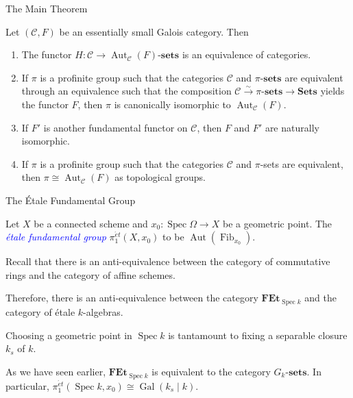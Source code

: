 \documentclass{beamer}
\newcommand{\catSets}{\mathbf{Sets}}
\newcommand{\sets}[1]{#1\text{-}\mathbf{sets}}
\newcommand{\Aut}{\operatorname{Aut}}
\newcommand{\Gal}{\operatorname{Gal}}
\newcommand{\Spec}{\operatorname{Spec}}
\newcommand{\scrC}{\mathscr{C}} %
\newcommand{\define}[1]{\textcolor{blue}{\textit{#1}}}
\begin{document}
\begin{frame}{The Main Theorem}
	\begin{theorem}
		Let $(\scrC, F)$ be an essentially small Galois category. Then 
		\begin{enumerate}
			\item The functor $H:\scrC\to\sets{\Aut_{\scrC}(F)}$ is an equivalence of categories. \pause 
			\item If $\pi$ is a profinite group such that the categories $\scrC$ and $\sets{\pi}$ are equivalent through an equivalence such that the composition $\scrC\xrightarrow{\sim}\sets{\pi}\to\catSets$ yields the functor $F$, then $\pi$ is canonically isomorphic to $\Aut_{\scrC}(F)$. \pause 
			\item If $F'$ is another fundamental functor on $\scrC$, then $F$ and $F'$ are naturally isomorphic. \pause 
			\item If $\pi$ is a profinite group such that the categories $\scrC$ and $\pi$-sets are equivalent, then $\pi\cong\Aut_{\scrC}(F)$ as topological groups. \pause 
		\end{enumerate}
	\end{theorem}
\end{frame}

\begin{frame}{The \'Etale Fundamental Group}
	\begin{definition}
		Let $X$ be a connected scheme and $x_0: \Spec\Omega\to X$ be a geometric point. The \define{\'etale fundamental group} $\pi_1^{\acute{e}t}(X, x_0)$ to be $\Aut(\operatorname{Fib}_{x_0})$.
	\end{definition}

	Recall that there is an anti-equivalence between the category of commutative rings and the category of affine schemes. 

	Therefore, there is an anti-equivalence between the category $\mathbf{FEt}_{\Spec k}$ and the category of \'etale $k$-algebras.

	Choosing a geometric point in $\Spec k$ is tantamount to fixing a separable closure $k_s$ of $k$.

	As we have seen earlier, $\mathbf{FEt}_{\Spec k}$ is equivalent to the category $\sets{G_k}$. 
	In particular, $\pi_1^{\acute{e}t}(\Spec k, x_0)\cong\Gal(k_s\mid k)$.
\end{frame}
\end{document}
